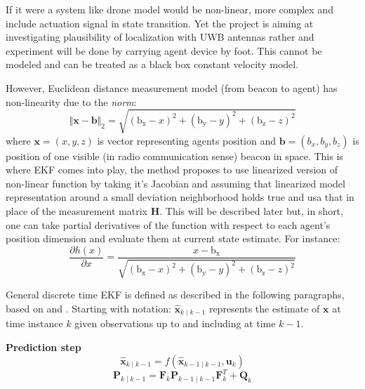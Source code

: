 If it were a system like drone model would be non-linear, more complex and include actuation signal in state transition. Yet the project is aiming at investigating plausibility of localization with UWB antennas rather and experiment will be done by carrying agent device by foot. This cannot be modeled and can be treated as a black box constant velocity model.

However, Euclidean distance measurement model (from beacon to agent) has non-linearity due to the \emph{norm}:
$$
    \Vert\boldsymbol{x}-\boldsymbol{b}\Vert_2 = \sqrt{{\left(\mathrm{b_x}-x\right)}^2+{\left(\mathrm{b_y}-y\right)}^2+{\left(\mathrm{b_z}-z\right)}^2}
$$
where $\boldsymbol{x} = (x,y,z)$ is vector representing agents position and $\boldsymbol{b} = (b_x,b_y,b_z)$ is position of one visible (in radio communication sense) beacon in space. This is where EKF comes into play, the method proposes to use linearized version of non-linear function by taking it's Jacobian and assuming that linearized model representation around a small deviation neighborhood holds true and usa that in place of the measurement matrix $\boldsymbol{H}$. This will be described later but, in short, one can take partial derivatives of the function with respect to each agent's position dimension and evaluate them at current state estimate. For instance:
$$
    \frac{\partial h(x)}{\partial x} = \frac{x-\mathrm{b_x}}{\sqrt{{\left(\mathrm{b_x}-x\right)}^2+{\left(\mathrm{b_y}-y\right)}^2+{\left(\mathrm{b_z}-z\right)}^2}}
$$

General discrete time EKF is defined as described in the following paragraphs, based on \cite{probrobotics} and \cite{welch1995introduction}. Starting with notation: $\hat{\mathbf{x}}_{k \mid k-1}$ represents the  estimate of $\mathbf{x}$ at time instance $k$ given observations up to and including at time $k-1$. \smallskip

\textbf{Prediction step} \smallskip
$$\hat{\boldsymbol{x}}_{k \mid k-1}=f\left(\hat{\boldsymbol{x}}_{k-1 \mid k-1}, \boldsymbol{u}_k\right)$$
$$\boldsymbol{P}_{k \mid k-1}=\boldsymbol{F}_k \boldsymbol{P}_{k-1 \mid k-1} \boldsymbol{F}_k^T+\boldsymbol{Q}_k$$

